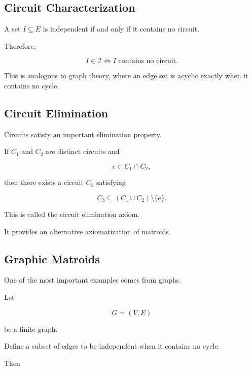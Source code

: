 \subsection{Circuit Characterization}
\label{subsec:circuit-characterization}

A set \(I\subseteq E\) is independent if and only if it contains no
circuit.

Therefore,

\[
\boxed{
I\in\mathcal{I}
\iff
\text{\(I\) contains no circuit}.
}
\]

This is analogous to graph theory, where an edge set is acyclic exactly
when it contains no cycle.

\subsection{Circuit Elimination}
\label{subsec:circuit-elimination}

Circuits satisfy an important elimination property.

If \(C_1\) and \(C_2\) are distinct circuits and

\[
e\in C_1\cap C_2,
\]

then there exists a circuit \(C_3\) satisfying

\[
\boxed{
C_3
\subseteq
(C_1\cup C_2)\setminus\{e\}.
}
\]

This is called the circuit elimination axiom.

It provides an alternative axiomatization of matroids.

\subsection{Graphic Matroids}
\label{subsec:graphic-matroids}

One of the most important examples comes from graphs.

Let

\[
G=(V,E)
\]

be a finite graph.

Define a subset of edges to be independent when it contains no cycle.

Then

